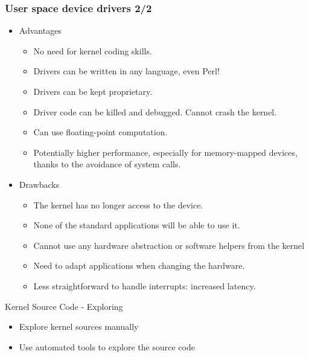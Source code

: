 \begin{frame}
  \frametitle{User space device drivers 2/2}
  \begin{itemize}
  \item Advantages
    \begin{itemize}
    \item No need for kernel coding skills.
    \item Drivers can be written in any language, even Perl!
    \item Drivers can be kept proprietary.
    \item Driver code can be killed and debugged. Cannot crash the
      kernel.
    \item Can use floating-point computation.
    \item Potentially higher performance, especially for
      memory-mapped devices, thanks to the avoidance of system calls.
    \end{itemize}
  \item Drawbacks
    \begin{itemize}
    \item The kernel has no longer access to the device.
    \item None of the standard applications will be able to use it.
    \item Cannot use any hardware abstraction or software helpers from
      the kernel
    \item Need to adapt applications when changing the hardware.
    \item Less straightforward to handle interrupts: increased latency.
    \end{itemize}
  \end{itemize}
\end{frame}

\setuplabframe
{Kernel Source Code - Exploring}
{
  \begin{itemize}
  \item Explore kernel sources manually
  \item Use automated tools to explore the source code
  \end{itemize}
}

